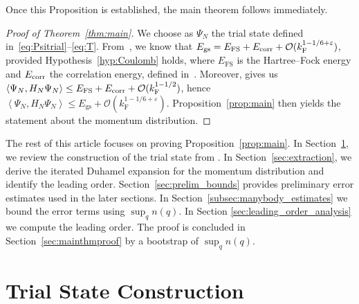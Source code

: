 \documentclass[12pt,a4paper]{article}
\numberwithin{equation}{section}
\newcommand{\cO}{\mathcal{O}}
\newcommand{\1}{\mathbb{I}}
\newcommand{\corr}{\textnormal{corr}}
\newcommand{\F}{\mathrm{F}}
\newcommand{\FS}{\mathrm{FS}}
\newcommand{\GS}{\mathrm{gs}}
\newcommand{\eva}[1]{\left\langle #1 \right\rangle}
\theoremstyle{plain}
\theoremstyle{definition}
\theoremstyle{remark}
\theoremstyle{plain}
\theoremstyle{definition}
\theoremstyle{remark}
\begin{document}
Once this Proposition is established, the main theorem follows immediately.

\begin{proof}[Proof of Theorem~\ref{thm:main}]
We choose as $ \Psi_N $ the trial state defined in~\eqref{eq:Psitrial}--\eqref{eq:T}.
From~\cite[Corr.~1.3]{CHN24}, we know that $ E_{\GS} = E_{\FS} + E_{\corr} + \cO(k_{\F}^{1 - 1/6 + \varepsilon}) $, provided Hypothesis~\ref{hyp:Coulomb} holds, where $ E_{\FS} $ is the Hartree--Fock energy and $ E_{\corr}$ the correlation energy, defined in~\cite[(1.2) and (1.11)]{CHN24}. Moreover, \cite[Thm.~1.1]{CHN23} gives us $ \eva{\Psi_N, H_N \Psi_N} \le E_{\FS} + E_{\corr} + \cO(k_{\F}^{1 - 1/2}) $, hence $ \eva{\Psi_N, H_N \Psi_N} \le E_{\GS} + \cO(k_{\F}^{1 - 1/6+ \varepsilon}) $.
Proposition~\ref{prop:main} then yields the statement about the momentum distribution.
\end{proof}


The rest of this article focuses on proving Proposition~\ref{prop:main}.
In Section~\ref{sec:trialstate}, we review the construction of the trial state from \cite{CHN23}. In Section~\ref{sec:extraction}, we derive the iterated Duhamel expansion for the momentum distribution and identify the leading order. Section~\ref{sec:prelim_bounds} provides preliminary error estimates used in the later sections. In Section~\ref{subsec:manybody_estimates} we bound the error terms using $\sup_q n(q)$. In Section \ref{sec:leading_order_analysis} we compute the leading order. The proof is concluded in Section~\ref{sec:mainthmproof} by a bootstrap of $\sup_q n(q)$.





\section{Trial State Construction}
\label{sec:trialstate}
\end{document}
